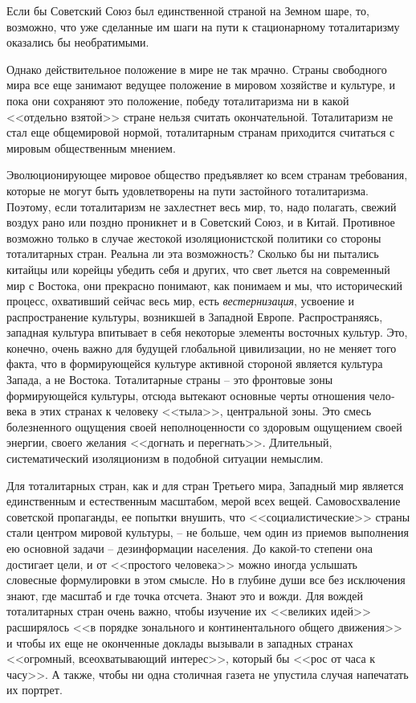 \documentclass{book}
\begin{document}
Если бы Советский Союз был единственной страной на Земном шаре, то, возможно, что уже сделанные им шаги на пути к стационарному тоталитаризму оказались бы необратимыми.

Однако действительное положение в мире не так мрачно. Страны свободного мира все еще занимают ведущее положение в мировом хозяйстве и культуре, и пока они сохраняют это поло­жение, победу тоталитаризма ни в какой <<отдельно взятой>> стране нельзя считать окончательной. Тоталитаризм не стал еще общемировой нормой, тоталитарным странам приходится считаться с мировым общественным мнением.

Эволюционирующее мировое общество предъявляет ко всем странам требования, которые не могут быть удовлетво­рены на пути застойного тоталитаризма. Поэтому, если тотали­таризм не захлестнет весь мир, то, надо полагать, свежий воз­дух рано или поздно проникнет и в Советский Союз, и в Ки­тай. Противное возможно только в случае жестокой изоляци­онистской политики со стороны тоталитарных стран. Реальна ли эта возможность? Сколько бы ни пытались китайцы или ко­рейцы убедить себя и других, что свет льется на современный мир с Востока, они прекрасно понимают, как понимаем и мы, что исторический процесс, охвативший сейчас весь мир, есть \textit{вестернизация},  усвоение и распространение культуры, возник­шей в Западной Европе. Распространяясь, западная культура впитывает в себя некоторые элементы восточных культур. Это, конечно, очень важно для будущей глобальной цивили­зации, но не меняет того факта, что в формирующейся культу­ре активной стороной является культура Запада, а не Востока. Тоталитарные страны -- это 
фронтовые 
зоны формирующейся культуры, отсюда вытекают основные черты отношения чело­века в этих странах к человеку <<тыла>>, центральной зоны. Это смесь болезненного ощущения своей неполноценности со здо­ровым ощущением своей энергии, своего желания <<догнать и перегнать>>. Длительный, систематический изоляционизм в по­добной ситуации немыслим.

Для тоталитарных стран, как и для стран Третьего мира, Западный мир является единственным и естественным масшта­бом, мерой всех вещей. Самовосхваление советской пропаган­ды, ее попытки внушить, что <<социалистические>> страны ста­ли центром мировой культуры, -- не больше, чем один из при­емов выполнения ею основной задачи -- дезинформации насе­ления. До какой-то степени она достигает цели, и от <<простого человека>> можно иногда услышать словесные формулировки в этом смысле. Но в глубине души все без исключения знают, где масштаб и где точка отсчета. Знают это и вожди. Для вож­дей тоталитарных стран очень важно, чтобы изучение их <<вели­ких идей>> расширялось <<в порядке зонального и континенталь­ного общего движения>> и чтобы их еще не оконченные докла­ды вызывали в западных странах <<огромный, всеохватываю­щий интерес>>, который бы <<рос от часа к часу>>. А также, чтобы ни одна столичная газета не упустила случая напечатать их порт­рет.
\end{document}
